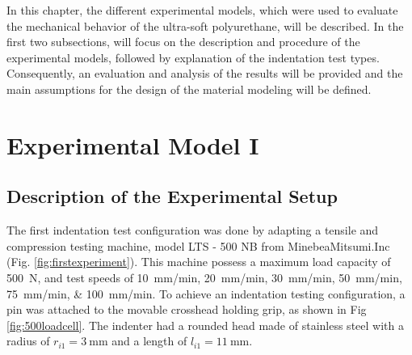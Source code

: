 In this chapter, the different experimental models, which were used to evaluate the 
mechanical behavior of the ultra-soft polyurethane, will be 
described. In the first two subsections, will focus on the description and 
procedure of the experimental models, followed by explanation of the indentation test 
types. Consequently, an evaluation and analysis of the results will be provided and the 
main assumptions for the design of the material modeling will be defined. 
\\ 


\section{Experimental Model I}
\label{section:expmod1}
    
\subsection*{Description of the Experimental Setup}

The first indentation test configuration was done by adapting a tensile and compression 
testing machine, model LTS - 500 NB from MinebeaMitsumi.Inc (Fig. \ref{fig:firstexperiment}). This 
machine possess a maximum load capacity of \SI{500}{\newton}, and test speeds of
\SIlist[per-mode = symbol]{10;20;30;50;75;100}{\milli \metre \per \minute}. To achieve an 
indentation testing configuration, a pin was attached to the movable crosshead holding grip, 
as shown in Fig \ref{fig:500loadcell}.
The indenter had a rounded head made of stainless steel with a
radius of $r_{i1} = \SI{3}{\milli \m}$ and a length of $l_{i1} = \SI{11}{\milli \m}$.

